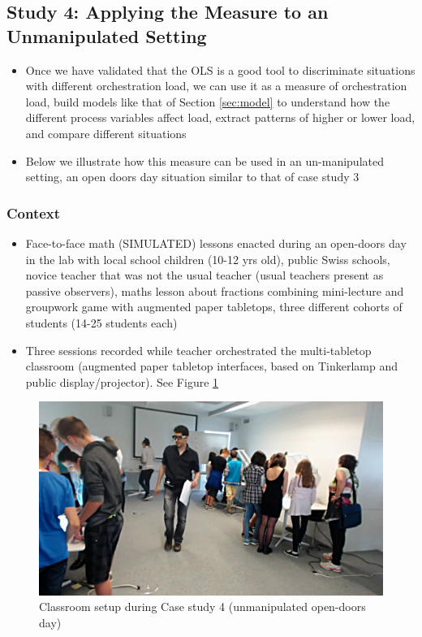 \documentclass[10pt,journal,compsoc]{IEEEtran}
\begin{document}
\subsection{Study 4: Applying the Measure to an Unmanipulated Setting}
\label{sec:study4}

\begin{itemize}
\item Once we have validated that the OLS is a good tool to discriminate situations with different orchestration load, we can use it as a measure of orchestration load, build models like that of Section \ref{sec:model} to understand how the different process variables affect load, extract patterns of higher or lower load, and compare different situations
\item Below we illustrate how this measure can be used in an un-manipulated setting, an open doors day situation similar to that of case study 3
\end{itemize}

\subsubsection{Context}

\begin{itemize}
\item Face-to-face math (SIMULATED) lessons enacted during an open-doors day in the lab with local school children (10-12 yrs old), public Swiss schools, novice teacher that was not the usual teacher (usual teachers present as passive observers), maths lesson about fractions combining mini-lecture and groupwork game with augmented paper tabletops, three different cohorts of students (14-25 students each)
\item Three sessions recorded while teacher orchestrated the multi-tabletop classroom (augmented paper tabletop interfaces, based on Tinkerlamp \cite{do2012tinkerlamp} and public display/projector). See Figure \ref{fig:case4picture}
\end{itemize}

\begin{figure}[!t]
\centering
\includegraphics[width=\linewidth]{img/Case4Picture}
\caption{Classroom setup during Case study 4 (unmanipulated open-doors day)}
\label{fig:case4picture}
\end{figure}
\end{document}
